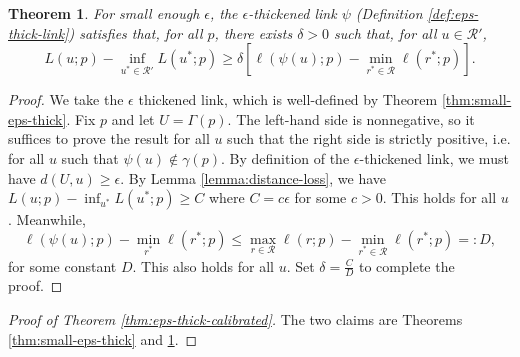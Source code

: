 \documentclass[11pt]{article}
\newcommand{\R}{\mathcal{R}}
\newtheorem{theorem}{Theorem}
\begin{document}
\begin{theorem} \label{thm:app-eps-thick-sep}
  For small enough $\epsilon$, the $\epsilon$-thickened link $\psi$ (Definition \ref{def:eps-thick-link}) satisfies that, for all $p$, there exists $\delta > 0$ such that, for all $u \in \R'$,
    \[ L(u;p) - \inf_{u^* \in \R'} L(u^*;p) \geq \delta \left[ \ell(\psi(u);p) - \min_{r^* \in \R} \ell(r^*;p) \right] . \]
\end{theorem}
\begin{proof}
  We take the $\epsilon$ thickened link, which is well-defined by Theorem \ref{thm:small-eps-thick}.
  Fix $p$ and let $U = \Gamma(p)$.
  The left-hand side is nonnegative, so it suffices to prove the result for all $u$ such that the right side is strictly positive, i.e. for all $u$ such that $\psi(u) \not\in \gamma(p)$.
  By definition of the $\epsilon$-thickened link, we must have $d(U,u) \geq \epsilon$.
  By Lemma \ref{lemma:distance-loss}, we have $L(u;p) - \inf_{u^*} L(u^*;p) \geq C$ where $C = c\epsilon$ for some $c > 0$.
  This holds for all $u$.
  Meanwhile,
    \[ \ell(\psi(u);p) - \min_{r^*} \ell(r^*;p) \leq \max_{r \in \R} \ell(r;p) - \min_{r^* \in \R} \ell(r^*;p) =: D, \]
  for some constant $D$.
  This also holds for all $u$.
  Set $\delta = \frac{C}{D}$ to complete the proof.
\end{proof}

\begin{proof}[Proof of Theorem \ref{thm:eps-thick-calibrated}]
  The two claims are Theorems \ref{thm:small-eps-thick} and \ref{thm:app-eps-thick-sep}.
\end{proof}
\end{document}
